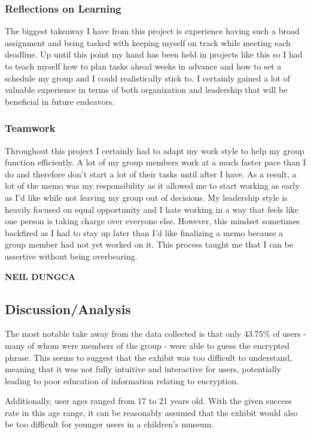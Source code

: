\documentclass[conference]{IEEEtran}
\begin{document}
\subsubsection{Reflections on Learning}

\par The biggest takeaway I have from this project is experience having such a broad assignment and being tasked with keeping myself on track while meeting each deadline. Up until this point my hand has been held in projects like this so I had to teach myself how to plan tasks ahead weeks in advance and how to set a schedule my group and I could realistically stick to. I certainly gained a lot of valuable experience in terms of both organization and leadership that will be beneficial in future endeavors. 

\subsubsection{Teamwork}

\par Throughout this project I certainly had to adapt my work style to help my group function efficiently. A lot of my group members work at a much faster pace than I do and therefore don’t start a lot of their tasks until after I have. As a result, a lot of the memo was my responsibility as it allowed me to start working as early as I’d like while not leaving my group out of decisions. My leadership style is heavily focused on equal opportunity and I hate working in a way that feels like one person is taking charge over everyone else. However, this mindset sometimes backfired as I had to stay up later than I’d like finalizing a memo because a group member had not yet worked on it. This process taught me that I can be assertive without being overbearing.

\newpage


\vspace{10pt} \LARGE \textbf{NEIL DUNGCA} \normalsize

\subsection{Discussion/Analysis}

\par The most notable take away from the data collected is that only 43.75\% of users - many of whom were members of the group - were able to guess the encrypted phrase.  This seems to suggest that the exhibit was too difficult to understand, meaning that it was not fully intuitive and interactive for users, potentially leading to poor education of information relating to encryption.  
\par Additionally, user ages ranged from 17 to 21 years old.  With the given success rate in this age range, it can be reasonably assumed that the exhibit would also be too difficult for younger users in a children’s museum. 
\end{document}

